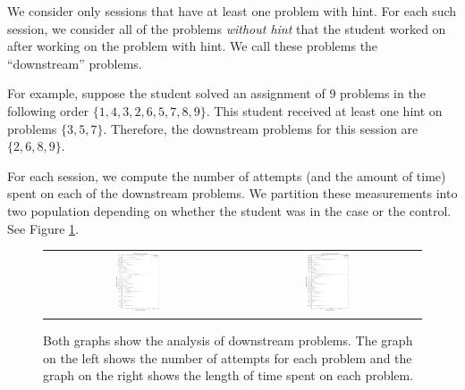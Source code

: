 \documentclass{sigchi/sigchi}
\begin{document}
We consider only sessions that have at least one problem with
hint. For each such session, we consider all of the problems {\em
  without hint} that the student worked on after working on the
problem with hint. We call these problems the ``downstream'' problems.

For example, suppose the student solved an assignment of 9 problems in the
following order $\{ 1, 4, 3, 2, 6, 5, 7, 8, 9\}$. This student
received at least one hint on problems $\{3, 5, 7\}$. Therefore, the
downstream problems for this session are $\{2, 6, 8, 9\}$.

For each session, we compute the number of attempts (and the amount of
time) spent on each of the downstream problems. We partition these
measurements into two population depending on whether the student was
in the case or the control. See Figure \ref{fig:prob_analysis}.

\begin{figure}[ht]
  \centering
   \begin{tabular}{c c}
		\includegraphics[width=0.25\textwidth]{image/problem_tries_downstream.png} &
		\includegraphics[width=0.25\textwidth]{image/problem_time_downstream.png}
	\end{tabular}
   \caption{Both graphs show the analysis of downstream problems. The graph on the left shows the number of attempts for each problem and the graph on the right shows the length of time spent on each problem.}
   \label{fig:prob_analysis}
\end{figure}
\end{document}
